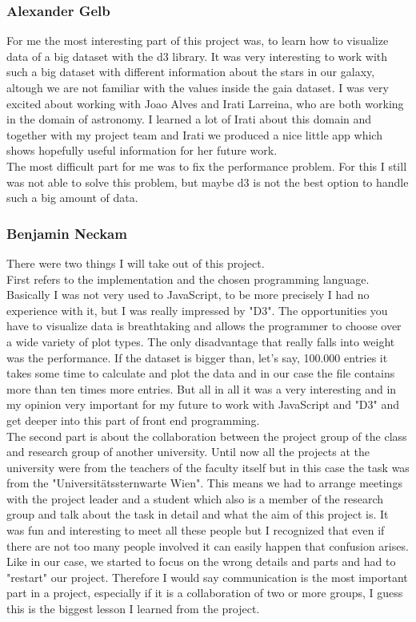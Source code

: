 \documentclass{vgtc}                          %
\begin{document}
\subsubsection{Alexander Gelb}
For me the most interesting part of this project was, to learn how to visualize data of a big dataset with the d3 library. It was very interesting to work with such a big dataset with different information about the stars in our galaxy, altough we are not familiar with the values inside the gaia dataset. I was very excited about working with Joao Alves and Irati Larreina, who are both working in the domain of astronomy. I learned a lot of Irati about this domain and together with my project team and Irati we produced a nice little app which shows hopefully useful information for her future work. \\
The most difficult part for me was to fix the performance problem. For this I still was not able to solve this problem, but maybe  d3 is not the best option to handle such a big amount of data.
\subsubsection{Benjamin Neckam}
There were two things I will take out of this project.\\
First refers to the implementation and the chosen programming language. Basically I was not very used to JavaScript, to be more precisely I had no experience with it, but I was really impressed by "D3". The opportunities you have to visualize data is breathtaking and allows the programmer to choose over a wide variety of plot types. The only disadvantage that really falls into weight was the performance. If the dataset is bigger than, let's say, 100.000 entries it takes some time to calculate and plot the data and in our case the file contains more than ten times more entries. But all in all it was a very interesting and in my opinion very important for my future to work with JavaScript and "D3" and get deeper into this part of front end programming.\\
The second part is about the collaboration between the project group of the class and research group of another university. Until now all the projects at the university were from the teachers of the faculty itself but in this case the task was from the "Universitätssternwarte Wien". This means we had to arrange meetings with the project leader and a student which also is a member of the research group and talk about the task in detail and what the aim of this project is. It was fun and interesting to meet all these people but I recognized that even if there are not too many people involved it can easily happen that confusion arises. Like in our case, we started to focus on the wrong details and parts and had to "restart" our project. Therefore I would say communication is the most important part in a project, especially if it is a collaboration of two or more groups, I guess this is the biggest lesson I learned from the project.
\end{document}
